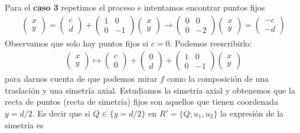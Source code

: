 \documentclass[14pt]{book}
\begin{document}
Para el \textbf{caso 3} repetimos el proceso e intentamos encontrar puntos fijos
\begin{align*}
	\left(\begin{array}{c}
	x \\ y
	\end{array}\right) = \left(\begin{array}{c}
	c \\ d
	\end{array}\right) + 
	\left(\begin{array}{cc}
	1 & 0 \\ 0 & -1
	\end{array}\right)\left(\begin{array}{c}
	x \\ y
	\end{array}\right) \to 
	\left(\begin{array}{cc}
		0 & 0 \\ 0 & -2
	\end{array}\right)\left(\begin{array}{c}
	x \\ y
	\end{array}\right) = \left(\begin{array}{c}
	-c \\ -d
	\end{array}\right)
\end{align*}
Observamos que solo hay puntos fijos si $c = 0$. Podemos reescribirlo:
\begin{align*}
\left(\begin{array}{c}
x \\ y
\end{array}\right) \mapsto \left(\begin{array}{c}
c \\ 0
\end{array}\right) + \left(\begin{array}{c}
0 \\ d
\end{array}\right) + 
\left(\begin{array}{cc}
1 & 0 \\ 0 & -1
\end{array}\right)\left(\begin{array}{c}
x \\ y
\end{array}\right)
\end{align*}
para darnos cuenta de que podemos mirar $f$ como la composición de una traslación y una simetría axial. Estudiamos la simetría axial y obtenemos que la recta de puntos (recta de simetría) fijos son aquellos que tienen coordenada $y = d/2$. Es decir que si $Q \in \{y = d/2\}$ en $R' = \{Q; u_1, u_2\}$ la expresión de la simetría es
\end{document}
